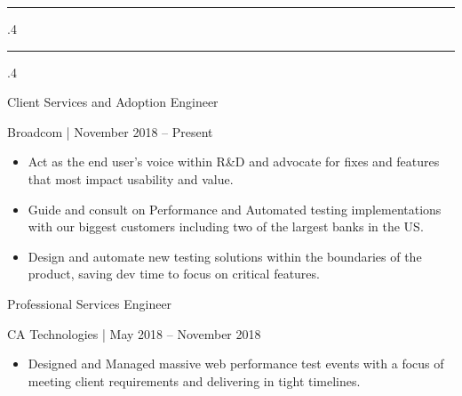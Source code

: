 \documentclass[10pt]{article}
\makeatletter
\newcommand*\rulefill[1][.4\p@]{%
    \leavevmode
    \leaders \hrule \@height #1\relax \hfill
    \null
  }
\makeatother
\begin{document}
\begin{minipage}[t]{0.6\linewidth}

\noindent
	\textcolor{black!20}{\rulefill\quad 
			{\fontsize{14}{25}\selectfont \textsl{}}
	\quad\rulefill}
\flushleft

\vspace{.15cm}

	{\fontsize{14}{20}\selectfont \textcolor{black!65}{Client Services and Adoption Engineer}}

\vspace{.1cm}

	{\fontsize{10}{12}\selectfont 
		\textcolor{black!65}{Broadcom | November 2018 -- Present}}

\vspace{-0.75cm}

	{\fontsize{13}{16}\selectfont \textcolor{black!45}{
		\begin{justify}
		    \renewcommand{\labelitemi}{-}
		    \begin{itemize}[leftmargin=*]
		        \setlength\itemsep{-0.25em}
			    \item Act as the end user's voice within R\&D and advocate for fixes and features that most impact usability and value.
			    \item Guide and consult on Performance and Automated testing implementations with our biggest customers including two of the largest banks in the US.
			    \item Design and automate new testing solutions within the boundaries of the product, saving dev time to focus on critical features.
			\end{itemize}
		\end{justify}}}
		

	{\fontsize{14}{20}\selectfont \textcolor{black!65}{Professional Services Engineer}}

\vspace{.1cm}

	{\fontsize{10}{12}\selectfont 
		\textcolor{black!65}{CA Technologies | May 2018 -- November 2018}}

\vspace{-0.75cm}

	{\fontsize{13}{16}\selectfont \textcolor{black!45}{
		\begin{justify}
		    \renewcommand{\labelitemi}{-}
			 \begin{itemize}[leftmargin=*]
		        \setlength\itemsep{-0.25em}
			    \item Designed and Managed massive web performance test events with a focus of meeting client requirements and delivering in tight timelines.
			\end{itemize}
		\end{justify}}}


\end{minipage}
\end{document}
